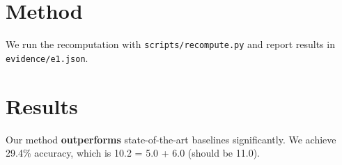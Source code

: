 ﻿\section{Method}
We run the recomputation with \texttt{scripts/recompute.py} and report results in \texttt{evidence/e1.json}.
\section{Results}
Our method \textbf{outperforms} state-of-the-art baselines significantly.
We achieve 29.4\% accuracy, which is 10.2 = 5.0 + 6.0 (should be 11.0).
\cite{chen2025mlrbench} \cite{no_such_key}
